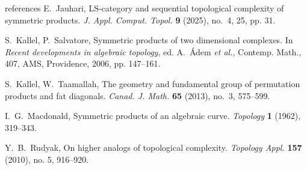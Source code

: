 \documentclass[amscd,amssymb,verbatim,10pt]{amsart}
\numberwithin{equation}{section}
\theoremstyle{plain}
\theoremstyle{definition}
\begin{document}
\begin{thebibliography}{references}
 E.~Jauhari, LS-category and sequential topological complexity of symmetric products. \emph{J. Appl. Comput. Topol.} \textbf{9} (2025), no.~4, 25, pp. 31.

 S.~Kallel, P.~Salvatore, Symmetric products of two dimensional complexes. In {\em Recent developments in algebraic topology}, ed. A.~\'Adem {\em et al.}, Contemp. Math., 407, AMS, Providence, 2006, pp. 147--161.

 S.~Kallel, W.~Taamallah, The geometry and fundamental group of permutation products and fat diagonals. \emph{Canad. J. Math.} \textbf{65} (2013), no.~3, 575--599.

 I.~G.~Macdonald, Symmetric products of an algebraic curve. \emph{Topology} \textbf{1} (1962), 319--343.

 Y.~B.~Rudyak, On higher analogs of topological complexity. \textit{Topology Appl.} \textbf{157} (2010), no. 5, 916--920. 
\end{thebibliography}
\end{document}
